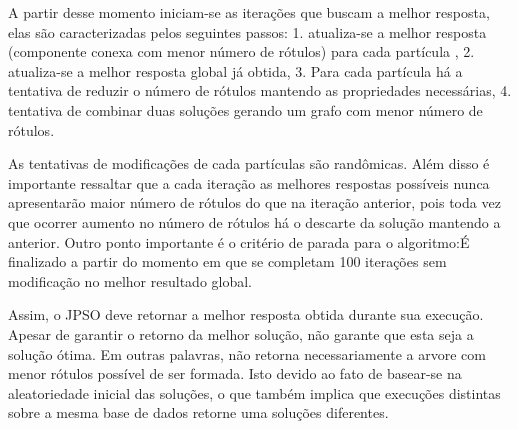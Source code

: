 \documentclass{sig-alternate-05-2015}
\begin{document}
A partir desse momento iniciam-se as iterações que buscam a melhor resposta, elas são caracterizadas pelos seguintes passos: 1. atualiza-se a melhor resposta 
(componente conexa com menor número de rótulos) para cada partícula , 2. atualiza-se a melhor resposta global já obtida, 3. Para cada partícula há a tentativa 
de reduzir o número de rótulos mantendo as propriedades necessárias, 4. tentativa de combinar duas soluções gerando um grafo com menor número de rótulos.

As tentativas de modificações de cada partículas são randômicas. Além disso é importante ressaltar que a cada iteração as
melhores respostas possíveis nunca apresentarão
maior número de rótulos do que na iteração anterior, pois toda vez que ocorrer aumento no número de rótulos há o descarte da solução mantendo a anterior.
Outro ponto importante é o critério de parada para o algoritmo:É finalizado a partir do momento em que se completam 100 iterações sem modificação no melhor
resultado global.

Assim, o JPSO deve retornar a melhor resposta obtida durante sua execução. Apesar de garantir o retorno da melhor solução, não garante que esta seja a solução 
ótima. Em outras palavras, não retorna necessariamente a arvore com menor rótulos possível de ser formada. Isto devido ao fato de basear-se na aleatoriedade 
inicial das soluções, o que também implica que execuções distintas sobre a mesma base de dados retorne uma soluções diferentes.
\end{document}
